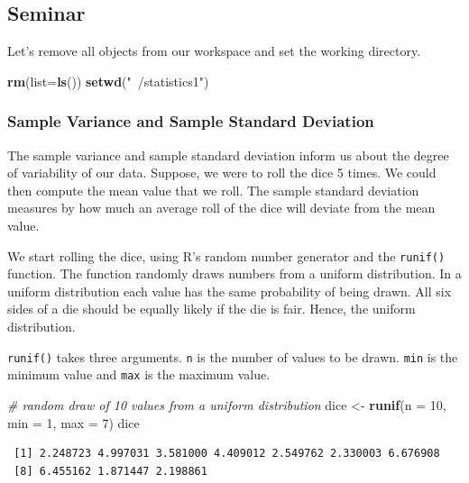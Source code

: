 \documentclass[]{article}
\newenvironment{Shaded}{\begin{snugshade}}{\end{snugshade}}
\newcommand{\KeywordTok}[1]{\textcolor[rgb]{0.13,0.29,0.53}{\textbf{#1}}}
\newcommand{\DataTypeTok}[1]{\textcolor[rgb]{0.13,0.29,0.53}{#1}}
\newcommand{\DecValTok}[1]{\textcolor[rgb]{0.00,0.00,0.81}{#1}}
\newcommand{\StringTok}[1]{\textcolor[rgb]{0.31,0.60,0.02}{#1}}
\newcommand{\CommentTok}[1]{\textcolor[rgb]{0.56,0.35,0.01}{\textit{#1}}}
\newcommand{\NormalTok}[1]{#1}
\theoremstyle{definition}
\theoremstyle{definition}
\theoremstyle{definition}
\theoremstyle{remark}
\begin{document}
\subsection{Seminar}\label{seminar-4}

Let's remove all objects from our workspace and set the working
directory.

\begin{Shaded}
\begin{Highlighting}[]
\KeywordTok{rm}\NormalTok{(}\DataTypeTok{list=}\KeywordTok{ls}\NormalTok{())}
\KeywordTok{setwd}\NormalTok{(}\StringTok{"~/statistics1"}\NormalTok{)}
\end{Highlighting}
\end{Shaded}

\subsubsection{Sample Variance and Sample Standard
Deviation}\label{sample-variance-and-sample-standard-deviation}

The sample variance and sample standard deviation inform us about the
degree of variability of our data. Suppose, we were to roll the dice 5
times. We could then compute the mean value that we roll. The sample
standard deviation measures by how much an average roll of the dice will
deviate from the mean value.

We start rolling the dice, using R's random number generator and the
\texttt{runif()} function. The function randomly draws numbers from a
uniform distribution. In a uniform distribution each value has the same
probability of being drawn. All six sides of a die should be equally
likely if the die is fair. Hence, the uniform distribution.

\texttt{runif()} takes three arguments. \texttt{n} is the number of
values to be drawn. \texttt{min} is the minimum value and \texttt{max}
is the maximum value.

\begin{Shaded}
\begin{Highlighting}[]
\CommentTok{# random draw of 10 values from a uniform distribution}
\NormalTok{dice <-}\StringTok{ }\KeywordTok{runif}\NormalTok{(}\DataTypeTok{n =} \DecValTok{10}\NormalTok{, }\DataTypeTok{min =} \DecValTok{1}\NormalTok{, }\DataTypeTok{max =} \DecValTok{7}\NormalTok{)}
\NormalTok{dice}
\end{Highlighting}
\end{Shaded}

\begin{verbatim}
 [1] 2.248723 4.997031 3.581000 4.409012 2.549762 2.330003 6.676908
 [8] 6.455162 1.871447 2.198861
\end{verbatim}
\end{document}
